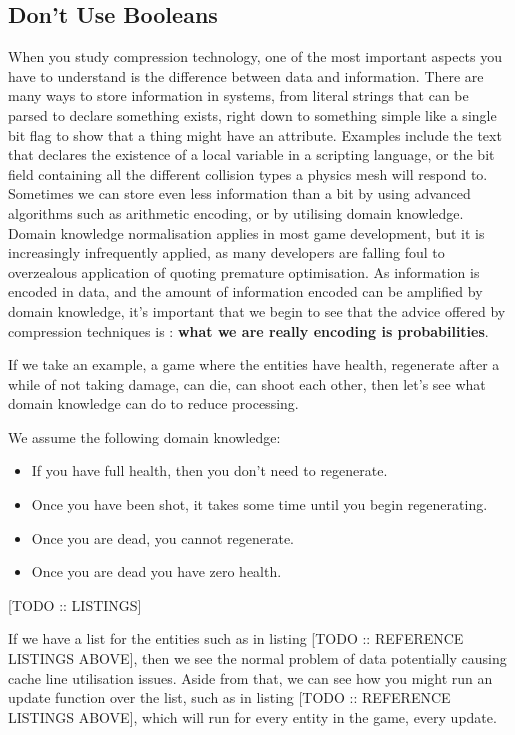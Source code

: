 \documentclass[a4paper,12pt]{book}
\begin{document}
\subsection{Don't Use Booleans}

When you study compression technology, one of the most important aspects you have to understand is the difference between data and information.
There are many ways to store information in systems, from literal strings that can be parsed to declare something exists, right down to something simple like a single bit flag to show that a thing might have an attribute.
Examples include the text that declares the existence of a local variable in a scripting language, or the bit field containing all the different collision types a physics mesh will respond to.
Sometimes we can store even less information than a bit by using advanced algorithms such as arithmetic encoding, or by utilising domain knowledge.
Domain knowledge normalisation applies in most game development, but it is increasingly infrequently applied, as many developers are falling foul to overzealous application of quoting premature optimisation.
As information is encoded in data, and the amount of information encoded can be amplified by domain knowledge, it's important that we begin to see that the advice offered by compression techniques is :
\textbf{what we are really encoding is probabilities}.

If we take an example, a game where the entities have health, regenerate after a while of not taking damage, can die, can shoot each other, then let's see what domain knowledge can do to reduce processing.

We assume the following domain knowledge:

\begin{itemize}
      \item
            If you have full health, then you don't need to regenerate.
      \item
            Once you have been shot, it takes some time until you begin regenerating.
      \item
            Once you are dead, you cannot regenerate.
      \item
            Once you are dead you have zero health.
\end{itemize}

[TODO :: LISTINGS]

If we have a list for the entities such as in listing [TODO :: REFERENCE LISTINGS ABOVE], then we see the normal problem of data potentially causing cache line utilisation issues.
Aside from that, we can see how you might run an update function over the list, such as in listing [TODO :: REFERENCE LISTINGS ABOVE], which will run for every entity in the game, every update.
\end{document}
